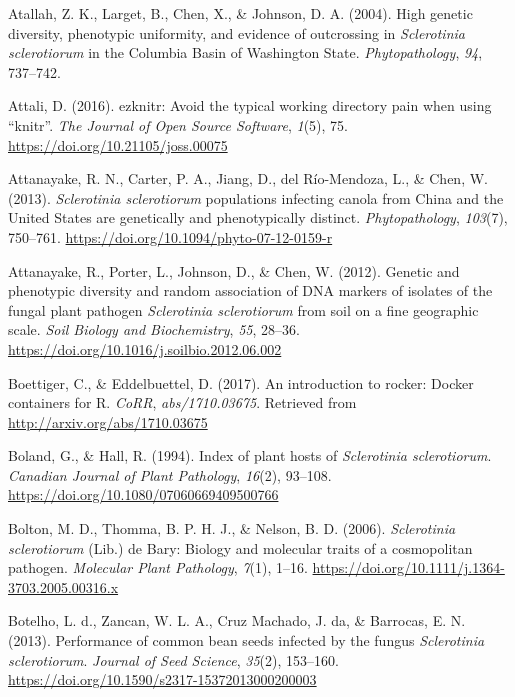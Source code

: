 \hypertarget{ref-atallah2004high}{}
Atallah, Z. K., Larget, B., Chen, X., \& Johnson, D. A. (2004). High
genetic diversity, phenotypic uniformity, and evidence of outcrossing in
\emph{Sclerotinia sclerotiorum} in the Columbia Basin of Washington
State. \emph{Phytopathology}, \emph{94}, 737--742.

\hypertarget{ref-attali2016ezknitr}{}
Attali, D. (2016). ezknitr: Avoid the typical working directory pain
when using ``knitr''. \emph{The Journal of Open Source Software},
\emph{1}(5), 75. \url{https://doi.org/10.21105/joss.00075}

\hypertarget{ref-attanayake2013sclerotinia}{}
Attanayake, R. N., Carter, P. A., Jiang, D., del Río-Mendoza, L., \&
Chen, W. (2013). \emph{Sclerotinia sclerotiorum} populations infecting
canola from China and the United States are genetically and
phenotypically distinct. \emph{Phytopathology}, \emph{103}(7), 750--761.
\url{https://doi.org/10.1094/phyto-07-12-0159-r}

\hypertarget{ref-attanayake2012genetic}{}
Attanayake, R., Porter, L., Johnson, D., \& Chen, W. (2012). Genetic and
phenotypic diversity and random association of DNA markers of isolates
of the fungal plant pathogen \emph{Sclerotinia sclerotiorum} from soil
on a fine geographic scale. \emph{Soil Biology and Biochemistry},
\emph{55}, 28--36. \url{https://doi.org/10.1016/j.soilbio.2012.06.002}

\hypertarget{ref-boettiger2017introduction}{}
Boettiger, C., \& Eddelbuettel, D. (2017). An introduction to rocker:
Docker containers for R. \emph{CoRR}, \emph{abs/1710.03675}. Retrieved
from \url{http://arxiv.org/abs/1710.03675}

\hypertarget{ref-boland1994index}{}
Boland, G., \& Hall, R. (1994). Index of plant hosts of
\emph{Sclerotinia sclerotiorum}. \emph{Canadian Journal of Plant
Pathology}, \emph{16}(2), 93--108.
\url{https://doi.org/10.1080/07060669409500766}

\hypertarget{ref-bolton2006sclerotinia}{}
Bolton, M. D., Thomma, B. P. H. J., \& Nelson, B. D. (2006).
\emph{Sclerotinia sclerotiorum} (Lib.) de Bary: Biology and molecular
traits of a cosmopolitan pathogen. \emph{Molecular Plant Pathology},
\emph{7}(1), 1--16.
\url{https://doi.org/10.1111/j.1364-3703.2005.00316.x}

\hypertarget{ref-botelho2013performance}{}
Botelho, L. d., Zancan, W. L. A., Cruz Machado, J. da, \& Barrocas, E.
N. (2013). Performance of common bean seeds infected by the fungus
\emph{Sclerotinia sclerotiorum}. \emph{Journal of Seed Science},
\emph{35}(2), 153--160.
\url{https://doi.org/10.1590/s2317-15372013000200003}


